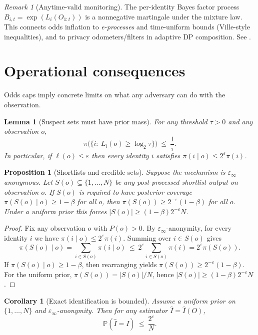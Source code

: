 \documentclass[11pt]{article}
\newcommand{\PP}{\mathbb{P}}
\newtheorem{proposition}{Proposition}
\newtheorem{lemma}{Lemma}
\newtheorem{corollary}{Corollary}
\theoremstyle{definition}
\theoremstyle{remark}
\newtheorem{remark}{Remark}
\begin{document}
\begin{remark}[Anytime-valid monitoring]
The per-identity Bayes factor process $B_{i,t}=\exp(L_i(O_{1:t}))$ is a nonnegative martingale under the mixture law.
This connects odds inflation to \emph{e-processes} and time-uniform bounds (Ville-style inequalities), and to privacy odometers/filters in adaptive DP composition.
See \cite{HowardRamdas2018,RogersOdometers2016}.
\end{remark}

\section{Operational consequences}
Odds caps imply concrete limits on what any adversary can do with the observation.

\begin{lemma}[Suspect sets must have prior mass]\label{lem:suspect}
For any threshold $\tau>0$ and any observation $o$,
\[
\pi\bigl(\{i:\ L_i(o)\ge \log_2\tau\}\bigr)\ \le\ \frac{1}{\tau}.
\]
In particular, if $\ell(o)\le \varepsilon$ then every identity $i$ satisfies $\pi(i\mid o)\le 2^\varepsilon \pi(i)$.
\end{lemma}

\begin{proposition}[Shortlists and credible sets]\label{prop:shortlist}
Suppose the mechanism is $\varepsilon_\infty$-anonymous.
Let $S(o)\subseteq\{1,\dots,N\}$ be any post-processed shortlist output on observation $o$.
If $S(o)$ is required to have posterior coverage $\pi(S(o)\mid o)\ge 1-\beta$ for all $o$, then $\pi(S(o))\ge 2^{-\varepsilon}(1-\beta)$ for all $o$.
Under a uniform prior this forces $|S(o)|\ge (1-\beta)2^{-\varepsilon}N$.
\end{proposition}

\begin{proof}
Fix any observation $o$ with $P(o)>0$.
By $\varepsilon_\infty$-anonymity, for every identity $i$ we have $\pi(i\mid o)\le 2^{\varepsilon}\pi(i)$.
Summing over $i\in S(o)$ gives
\[
\pi(S(o)\mid o)=\sum_{i\in S(o)}\pi(i\mid o)\ \le\ 2^{\varepsilon}\sum_{i\in S(o)}\pi(i)=2^{\varepsilon}\pi(S(o)).
\]
If $\pi(S(o)\mid o)\ge 1-\beta$, then rearranging yields $\pi(S(o))\ge 2^{-\varepsilon}(1-\beta)$.
For the uniform prior, $\pi(S(o))=|S(o)|/N$, hence $|S(o)|\ge (1-\beta)2^{-\varepsilon}N$.
\end{proof}

\begin{corollary}[Exact identification is bounded]\label{cor:identification}
Assume a uniform prior on $\{1,\dots,N\}$ and $\varepsilon_\infty$-anonymity.
Then for any estimator $\widehat I=\widehat I(O)$,
\[
\PP(\widehat I=I)\ \le\ \frac{2^{\varepsilon}}{N}.
\]
\end{corollary}
\end{document}
